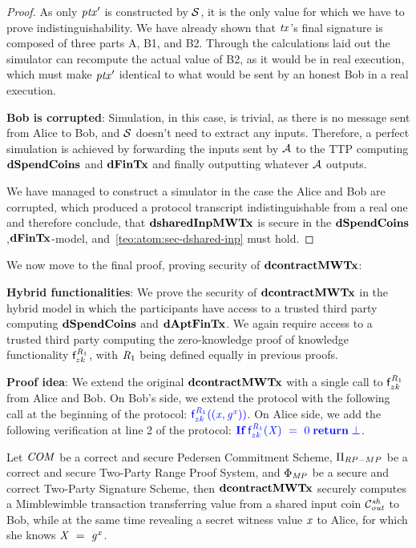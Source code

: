 \begin{proof}
    As only ${\mathit{ptx}}'$ is constructed by $\mathcal{S}$, it is the only value for which we have to prove indistinguishability.
    We have already shown that $\mathit{tx}$'s final signature is composed of three parts A, B1, and B2.
    Through the calculations laid out the simulator can recompute the actual value of B2, as it would be in real execution, which must make ${\mathit{ptx}}'$ identical to what would be sent by an honest Bob in a real execution.

    \textbf{Bob is corrupted}: Simulation, in this case, is trivial, as there is no message sent from Alice to Bob, and $\mathcal{S}$ doesn't need to extract any inputs.
    Therefore, a perfect simulation is achieved by forwarding the inputs sent by $\mathcal{A}$ to the TTP computing $\mathbf{dSpendCoins}$ and $\mathbf{dFinTx}$ and finally outputting whatever $\mathcal{A}$ outputs.

    We have managed to construct a simulator in the case the Alice and Bob are corrupted, which produced a protocol transcript indistinguishable from a real one and therefore conclude, that $\mathbf{dsharedInpMWTx}$ is secure in the $\mathbf{dSpendCoins}$,$\mathbf{dFinTx}$-model, and~\cref{teo:atom:sec-dshared-inp} must hold.
\end{proof}

We now move to the final proof, proving security of $\mathbf{dcontractMWTx}$:

\textbf{Hybrid functionalities}: We prove the security of $\mathbf{dcontractMWTx}$ in the hybrid model in which the participants have access to a trusted third party computing $\mathbf{dSpendCoins}$ and $\mathbf{dAptFinTx}$.
We again require access to a trusted third party computing the zero-knowledge proof of knowledge functionality $\mathsf{f}^{\mathit{R}_1}_{zk}$, with $\mathit{R}_1$ being defined equally in previous proofs.

\textbf{Proof idea}: We extend the original $\mathbf{dcontractMWTx}$ with a single call to $\mathsf{f}^{\mathit{R}_1}_{zk}$ from Alice and Bob.
On Bob's side, we extend the protocol with the following call at the beginning of the protocol: $\color{blue} \mathsf{f}^{\mathit{R}_1}_{zk}((\mathit{x}, \mathit{g}^{\mathit{x}}))$.
On Alice side, we add the following verification at line 2 of the protocol: $\color{blue} \textbf{If}\; \mathsf{f}^{\mathit{R}_1}_{zk}(\mathit{X}) ~=~ 0 \; \textbf{return}\; \bot$.

\begin{theorem}
    \label{teo:atom:sec-dcontract-mw}
    Let $\mathit{COM}$ be a correct and secure Pedersen Commitment Scheme, $\Pi_{RP-MP}$ be a correct and secure Two-Party Range Proof System, and $\Phi_{\mathit{MP}}$ be a secure and correct Two-Party Signature Scheme, then $\mathbf{dcontractMWTx}$ securely computes a Mimblewimble transaction transferring value from a shared input coin $\mathcal{C}_{\mathit{out}}^{\mathit{sh}}$ to Bob, while at the same time revealing a secret witness value $\mathit{x}$ to Alice, for which she knows $\mathit{X} ~=~ \mathit{g}^{\mathit{x}}$.
\end{theorem}


